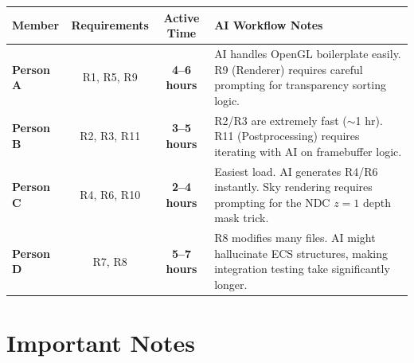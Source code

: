 \documentclass[12pt,a4paper]{article}
\begin{document}
\begin{center}
\renewcommand{\arraystretch}{1.3}
\begin{tabular}{l c c p{6cm}}
\toprule
\textbf{Member} & \textbf{Requirements} & \textbf{Active Time} & \textbf{AI Workflow Notes} \\
\midrule
\textcolor{personA}{\textbf{Person A}} & R1, R5, R9  & \textbf{4--6 hours} & AI handles OpenGL boilerplate easily. R9 (Renderer) requires careful prompting for transparency sorting logic. \\
\textcolor{personB}{\textbf{Person B}} & R2, R3, R11 & \textbf{3--5 hours} & R2/R3 are extremely fast ($\sim$1 hr). R11 (Postprocessing) requires iterating with AI on framebuffer logic. \\
\textcolor{personC}{\textbf{Person C}} & R4, R6, R10 & \textbf{2--4 hours} & Easiest load. AI generates R4/R6 instantly. Sky rendering requires prompting for the NDC $z=1$ depth mask trick. \\
\textcolor{personD}{\textbf{Person D}} & R7, R8      & \textbf{5--7 hours} & R8 modifies many files. AI might hallucinate ECS structures, making integration testing take significantly longer. \\
\bottomrule
\end{tabular}
\end{center}

\section{Important Notes}
\end{document}
